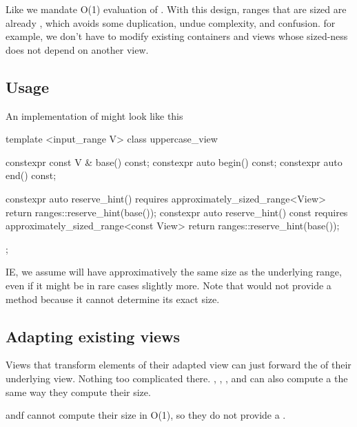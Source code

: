 \documentclass{wg21}
\begin{document}
Like  we mandate O(1) evaluation of .
With this design, ranges that are sized are already , which avoids some duplication, undue complexity, and confusion.
for example, we don't have to modify existing containers and views whose sized-ness does not depend on another view.

\subsection{Usage}

An implementation of  might look like this

\begin{colorblock}
template <input_range V>
class uppercase_view {
    constexpr const V & base() const;
    constexpr auto begin() const;
    constexpr auto end() const;

    constexpr auto reserve_hint() requires approximately_sized_range<View> {
        return ranges::reserve_hint(base());
    }
    constexpr auto reserve_hint() const requires approximately_sized_range<const View> {
        return ranges::reserve_hint(base());
    }
};
\end{colorblock}

IE, we assume  will have approximatively the same size as the underlying range, even if it might be in rare cases slightly more.
Note that  would not provide a  method because it cannot determine its exact size.

\subsection{Adapting existing views}

Views that transform elements of their adapted view can just forward the  of their underlying view.
Nothing too complicated there. , ,  ,  and  can also
compute a  the same way they compute their size.

 andf  cannot compute their size in O(1), so they do not provide a .

\subsubsection{}
\end{document}
